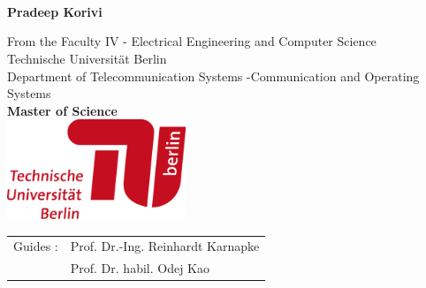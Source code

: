 \begin{titlepage}
\begin{center}
\vspace*{2.0cm}
 \\
\vspace*{0.2cm}
 \\
\vspace*{0.2cm}
 \\
\vspace*{0.5cm}
\noindent \large {\bf Pradeep Korivi} \\
\vspace*{0.2cm}

\noindent \large {From the Faculty IV - Electrical Engineering and Computer Science} \\
\vspace*{0.2cm}
\noindent \large {Technische Universit{\"a}t Berlin} \\
\vspace*{0.2cm}
\noindent \large {Department of Telecommunication Systems -Communication and Operating Systems} \\
\vspace*{0.2cm}
\noindent \large {\bf Master of Science} \\
\vspace*{0.2cm}
\vspace{2cm}
{\includegraphics[width=0.4\textwidth]{Images/university.png}}
\vspace*{2cm}
~\\
\begin{tabular}{ll}
	\noindent \large{ Guides :}	& \noindent \large{Prof. Dr.-Ing. Reinhardt Karnapke}\\
      \vspace*{0.1cm}
    \noindent \large{}	& \noindent \large{Prof. Dr. habil. Odej Kao}\\
     
	
\end{tabular}

\vspace*{1.5cm}

\end{center}
\end{titlepage}
\sloppy

\titlepage
